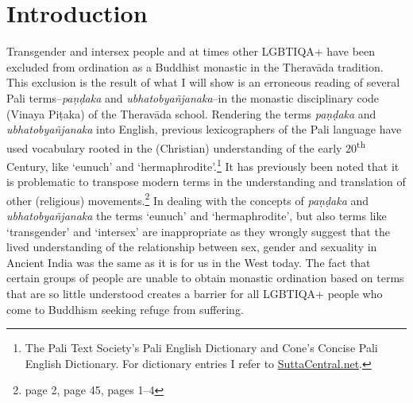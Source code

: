 \section{Introduction}
Transgender and intersex people and at times other LGBTIQA+ have been excluded from ordination as a Buddhist monastic in the Theravāda tradition. This exclusion is the result of what I will show is an erroneous reading of several Pali terms--{\em paṇḍaka} and {\em ubhatob­yañ­janaka}--in the monastic disciplinary code (Vinaya Piṭaka) of the Theravāda school. Rendering the terms {\em paṇḍaka} and {\em ubhatob­yañ­janaka} into English, previous lexicographers of the Pali language have used vocabulary rooted in the (Christian) understanding of the early 20\textsuperscript{th} Century, like `eunuch' and `hermaphrodite'.\footnote{The Pali Text Society's Pali English Dictionary and Cone's Concise Pali English Dictionary. For dictionary entries I refer to \href{https://suttacentral.net/}{SuttaCentral.net}.} It has previously been noted that it is problematic to transpose modern terms in the understanding and translation of other (religious) movements.\footnote{\cite{maes} page 2, \cite{dudas} page 45, \cite{artinger} pages 1–4} In dealing with the concepts of {\em paṇḍaka} and {\em ubhatob­yañ­janaka} the terms `eunuch' and `hermaphrodite', but also terms like `transgender' and `intersex' are inappropriate as they wrongly suggest that the lived understanding of the relationship between sex, gender and sexuality in Ancient India was the same as it is for us in the West today. The fact that certain groups of people are unable to obtain monastic ordination based on terms that are so little understood creates a barrier for all LGBTIQA+ people who come to Buddhism seeking refuge from suffering.

